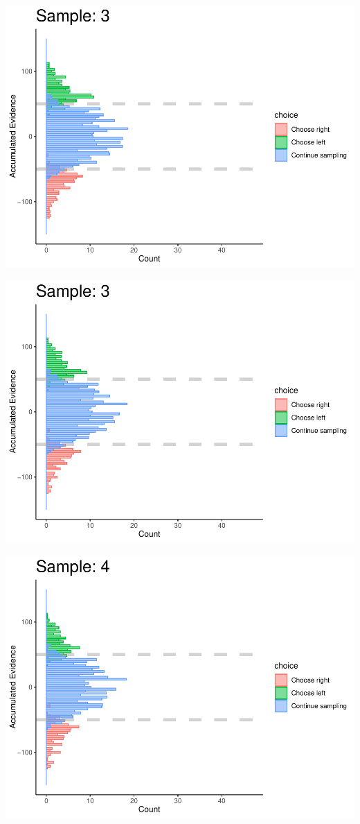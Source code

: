 \documentclass[
]{book}
\begin{document}
\begin{center}\includegraphics[width=0.8\linewidth]{LateNightBayes_files/figure-latex/fixed_check-28} \end{center}

\begin{center}\includegraphics[width=0.8\linewidth]{LateNightBayes_files/figure-latex/fixed_check-29} \end{center}

\begin{center}\includegraphics[width=0.8\linewidth]{LateNightBayes_files/figure-latex/fixed_check-30} \end{center}
\end{document}
